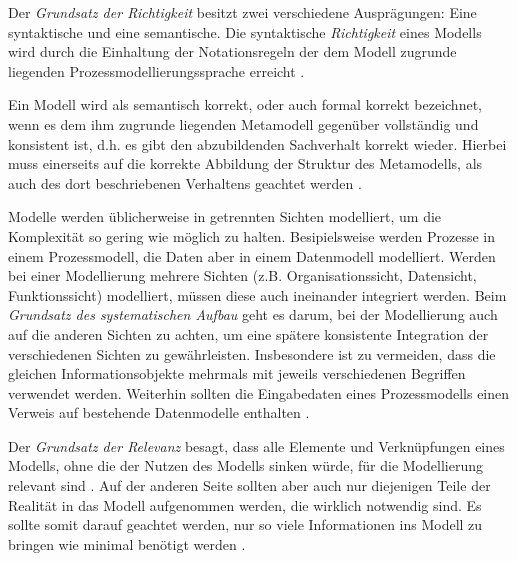 Der \textit{Grundsatz der Richtigkeit} besitzt zwei verschiedene Ausprägungen: Eine syntaktische und eine semantische. Die syntaktische \textit{Richtigkeit} eines Modells wird durch die Einhaltung der Notationsregeln der dem Modell zugrunde liegenden Prozessmodellierungssprache erreicht \cite{journals95, becker2012prozessmanagement}. \newline

Ein Modell wird als semantisch korrekt, oder auch formal korrekt bezeichnet, wenn es dem ihm zugrunde liegenden Metamodell gegenüber vollständig und konsistent ist, d.h. es gibt den abzubildenden Sachverhalt korrekt wieder. Hierbei muss einerseits auf die korrekte Abbildung der Struktur des Metamodells, als auch des dort beschriebenen Verhaltens geachtet werden \cite{journals95, becker2012prozessmanagement}. \newline


Modelle werden üblicherweise in getrennten Sichten modelliert, um die Komplexität so gering wie möglich zu halten. Besipielsweise werden Prozesse in einem Prozessmodell, die Daten aber in einem Datenmodell modelliert. Werden bei einer Modellierung mehrere Sichten (z.B. Organisationssicht, Datensicht, Funktionssicht) modelliert, müssen diese auch ineinander integriert werden. Beim  \textit{Grundsatz des systematischen Aufbau} geht es darum, bei der Modellierung auch auf die anderen Sichten zu achten, um eine spätere konsistente Integration der verschiedenen Sichten zu gewährleisten. Insbesondere ist zu vermeiden, dass die gleichen Informationsobjekte mehrmals mit jeweils verschiedenen Begriffen verwendet werden. Weiterhin sollten die Eingabedaten eines Prozessmodells einen Verweis auf bestehende Datenmodelle enthalten \cite{journals95, freund2007, becker2012prozessmanagement,koch2011}.\newline

Der \textit{Grundsatz der Relevanz} besagt, dass alle Elemente und Verknüpfungen eines Modells, ohne die der Nutzen des Modells sinken würde, für die Modellierung relevant sind \cite{journals95, reinshagen2009}. Auf der anderen Seite sollten aber auch nur diejenigen Teile der Realität in das Modell aufgenommen werden, die wirklich notwendig sind. Es sollte somit darauf geachtet werden, nur so viele Informationen ins Modell zu bringen wie minimal benötigt werden \cite{journals95, freund2007,reinshagen2009}.\newline


